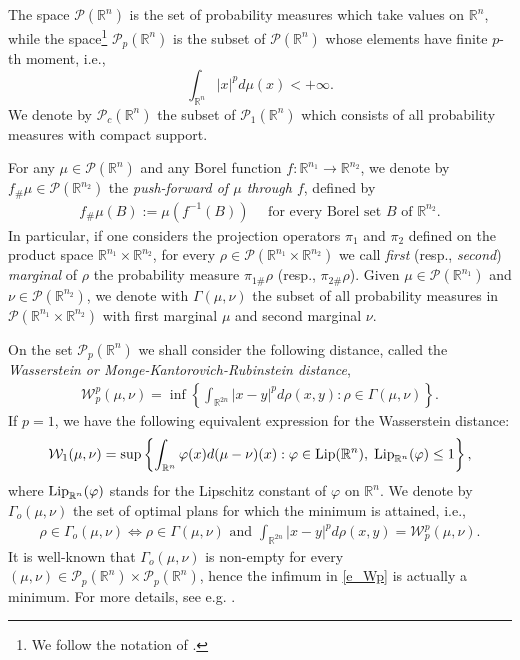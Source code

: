\documentclass[A4paper,11pt]{article}
\theoremstyle{definition}
\newcommand{\Lip}{\textup{Lip}}
\newcommand{\N}{\mathbb{N}}
\newcommand{\R}{\mathbb{R}}
\newcommand{\W}{\mathcal{W}}
\DeclareMathOperator{\supp}{supp}
\begin{document}
The space $\mathcal{P}(\R^n)$ is the set of probability measures which take values on $\R^n$, while the space\footnote{We follow the notation of \cite{AGS}.} $\mathcal{P}_p(\R^n)$ is the subset of $\mathcal{P}(\R^n)$ whose elements have finite $p$-th moment, i.e.,
$$\int_{\R^n} |x|^p d\mu(x) < +\infty.$$
We denote by $\mathcal{P}_c(\R^n)$ the subset of $\mathcal{P}_1(\R^n)$ which consists of all probability measures with compact support. %

For any $\mu \in \mathcal{P}(\R^n)$ and any Borel function $f: \R^{n_1} \to \R^{n_2}$, we denote by $f_{\#}\mu \in \mathcal{P}(\R^{n_2})$ the {\it push-forward of $\mu$ through $f$}, defined by
\begin{align*}
f_{\#}\mu(B) := \mu(f^{-1}(B)) \quad \text{ for every Borel set } B \text{ of } \R^{n_2}.
\end{align*}
In particular, if one considers the projection operators $\pi_1$ and $\pi_2$ defined on the product space $\R^{n_1} \times \R^{n_2}$, for every $\rho \in \mathcal{P}(\R^{n_1} \times \R^{n_2})$ we call {\it first} (resp., {\it second}) {\it marginal} of $\rho$ the probability measure $\pi_{1\#}\rho$ (resp., $\pi_{2\#}\rho$). Given $\mu \in \mathcal{P}(\R^{n_1})$ and $\nu \in \mathcal{P}(\R^{n_2})$, we denote with $\Gamma(\mu, \nu)$ the subset of all probability measures in $\mathcal{P}(\R^{n_1} \times \R^{n_2})$ with first marginal $\mu$ and second marginal $\nu$.

On the set $\mathcal{P}_p(\R^n)$ we shall consider the following distance, called the {\it Wasserstein or Monge-Kantorovich-Rubinstein distance},
\begin{align}  \label{e_Wp}
\W^p_p(\mu,\nu)=\inf \left \{ \int_{\R^{2n}} |x-y|^p d \rho(x,y) : \rho \in \Gamma(\mu,\nu) \right \}.
\end{align}
If $p = 1$, we have the following equivalent expression for the Wasserstein distance:
\begin{align*}
\W_1(\mu,\nu)=\sup \left \{ \int_{\R^n} \varphi(x) d (\mu-\nu)(x)  : \varphi \in \Lip(\R^n), \; \Lip_{\R^n}(\varphi) \leq 1 \right \},
\end{align*}
where $\Lip_{\R^n}(\varphi)$ stands for the Lipschitz constant of $\varphi$ on $\R^n$. We denote by $\Gamma_o(\mu,\nu)$ the set of optimal plans for which the minimum is attained, i.e.,
\begin{align*}
\rho \in \Gamma_o(\mu, \nu) \iff \rho \in \Gamma(\mu, \nu) \text{ and } \int_{\R^{2n}} | x - y |^p d \rho(x,y) = \W^p_p(\mu,\nu).
\end{align*}
It is well-known that $\Gamma_o(\mu, \nu)$ is non-empty for every $(\mu,\nu) \in \mathcal{P}_p(\R^n)\times\mathcal{P}_p(\R^n)$, hence the infimum in \eqref{e_Wp} is actually a minimum. For more details, see e.g. \cite{AGS,villani}.
\end{document}
